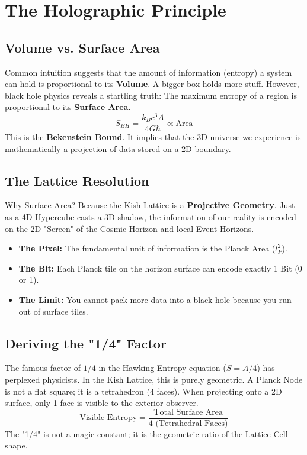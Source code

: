 \documentclass[11pt, letterpaper, openany]{book}
\begin{document}

\chapter{The Holographic Principle}
\label{chap:holographic_principle}

\section{Volume vs. Surface Area}
Common intuition suggests that the amount of information (entropy) a system can hold is proportional to its \textbf{Volume}. A bigger box holds more stuff.
However, black hole physics reveals a startling truth: The maximum entropy of a region is proportional to its \textbf{Surface Area}.
\begin{equation}
    S_{BH} = \frac{k_B c^3 A}{4 G \hbar} \propto \text{Area}
\end{equation}
This is the \textbf{Bekenstein Bound}. It implies that the 3D universe we experience is mathematically a projection of data stored on a 2D boundary.

\section{The Lattice Resolution}
Why Surface Area? Because the Kish Lattice is a \textbf{Projective Geometry}.
Just as a 4D Hypercube casts a 3D shadow, the information of our reality is encoded on the 2D "Screen" of the Cosmic Horizon and local Event Horizons.
\begin{itemize}
    \item \textbf{The Pixel:} The fundamental unit of information is the Planck Area ($l_P^2$).
    \item \textbf{The Bit:} Each Planck tile on the horizon surface can encode exactly 1 Bit (0 or 1).
    \item \textbf{The Limit:} You cannot pack more data into a black hole because you run out of surface tiles.
\end{itemize}

\section{Deriving the "1/4" Factor}
The famous factor of $1/4$ in the Hawking Entropy equation ($S = A/4$) has perplexed physicists.
In the Kish Lattice, this is purely geometric.
A Planck Node is not a flat square; it is a tetrahedron (4 faces). When projecting onto a 2D surface, only 1 face is visible to the exterior observer.
\begin{equation}
    \text{Visible Entropy} = \frac{\text{Total Surface Area}}{4 \text{ (Tetrahedral Faces)}}
\end{equation}
The "1/4" is not a magic constant; it is the geometric ratio of the Lattice Cell shape.
\end{document}
